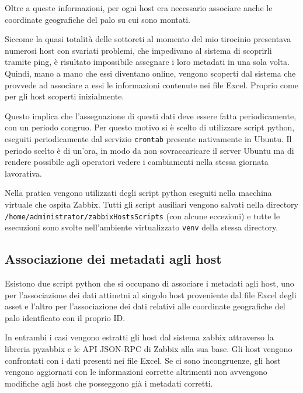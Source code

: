 \documentclass[12pt, a4paper, oneside]{report}
\begin{document}
Oltre a queste informazioni, per ogni host era necessario associare anche le coordinate geografiche del palo su cui sono montati.

Siccome la quasi totalità delle sottoreti al momento del mio tirocinio
presentava numerosi host con svariati problemi, che impedivano al sistema di scoprirli tramite
ping, è risultato impossibile assegnare i loro metadati in una sola volta.
Quindi, mano a mano che essi diventano online, vengono scoperti dal sistema che provvede ad associare
a essi le informazioni contenute nei file Excel. Proprio come per gli host scoperti inizialmente.

Questo implica che l'assegnazione di questi dati deve essere fatta periodicamente,
con un periodo congruo. Per questo motivo si è scelto di utilizzare script python, eseguiti periodicamente
dal servizio \texttt{crontab} \parencite{man_crontab} presente nativamente in Ubuntu. Il periodo scelto è di un'ora, in modo da non sovraccaricare il server Ubuntu ma di rendere possibile agli operatori vedere i cambiamenti nella stessa giornata lavorativa.

Nella pratica vengono utilizzati degli script python eseguiti nella macchina virtuale che
ospita Zabbix. Tutti gli script ausiliari vengono salvati nella directory
\texttt{/home/administrator/zabbixHostsScripts} (con alcune eccezioni) e tutte le esecuzioni sono svolte nell'ambiente
virtualizzato \texttt{venv} della stessa directory.

\subsection{Associazione dei metadati agli host}
Esistono due script python che si occupano di associare i metadati agli host, uno per l'associazione dei dati attinetni al singolo host proveniente dal file Excel degli asset e l'altro per l'associazione dei dati relativi alle coordinate geografiche del palo identficato con il proprio ID.

In entrambi i casi vengono estratti gli host dal sistema zabbix attraverso la libreria pyzabbix e le API JSON-RPC di Zabbix alla sua base. Gli host vengono confrontati con i dati presenti nei file Excel. Se ci sono incongruenze, gli host vengono aggiornati con le informazioni corrette altrimenti non avvengono modifiche agli host che posseggono già i metadati corretti.
\end{document}
